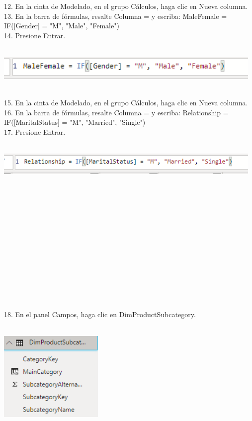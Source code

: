 \begin{flushleft}
\begin{itemize}
12. En la cinta de Modelado, en el grupo Cálculos, haga clic en Nueva columna.\\
13. En la barra de fórmulas, resalte Columna = y escriba:
MaleFemale = IF([Gender] = "M", "Male", "Female")\\
14. Presione Entrar.\\
\textbf{ }\\
\begin{center}
	\includegraphics[width=13cm]{./Imagenes/img35} 
	\end{center}
\textbf{ }\\




15. En la cinta de Modelado, en el grupo Cálculos, haga clic en Nueva columna.\\
16. En la barra de fórmulas, resalte Columna = y escriba:
Relationship = IF([MaritalStatus] = "M", "Married", "Single")\\
17. Presione Entrar.\\
\textbf{ }\\
\begin{center}
	\includegraphics[width=13cm]{./Imagenes/img36} 
	\end{center}
\textbf{ }\\
\textbf{ }\\
\textbf{ }\\
\textbf{ }\\
\textbf{ }\\
\textbf{ }\\
\textbf{ }\\
\textbf{ }\\
\textbf{ }\\
\textbf{ }\\
\textbf{ }\\
\textbf{ }\\
\textbf{ }\\

18. En el panel Campos, haga clic en DimProductSubcategory.\\
\textbf{ }\\
\begin{center}
	\includegraphics[width=5cm]{./Imagenes/img38} 
	\end{center}
\textbf{ }\\


\end{itemize}
\end{flushleft}
